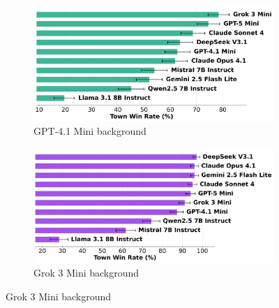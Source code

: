 \documentclass{article}
\begin{document}
\begin{figure}[htbp]
    \centering
    \begin{subfigure}[b]{0.48\textwidth}
        \centering
        \includegraphics[width=\textwidth]{../results/win_rates_disclose_gpt-41_mini.png}
        \caption{GPT-4.1 Mini background}
        \label{fig:detective_gpt41mini_appendix}
    \end{subfigure}
    \hfill
    \begin{subfigure}[b]{0.48\textwidth}
        \centering
        \includegraphics[width=\textwidth]{../results/win_rates_disclose_grok_3_mini.png}
        \caption{Grok 3 Mini background}
        \label{fig:detective_grok3_appendix}
    \end{subfigure}
    
    \vspace{0.5cm}
    

\end{figure}
\end{document}
